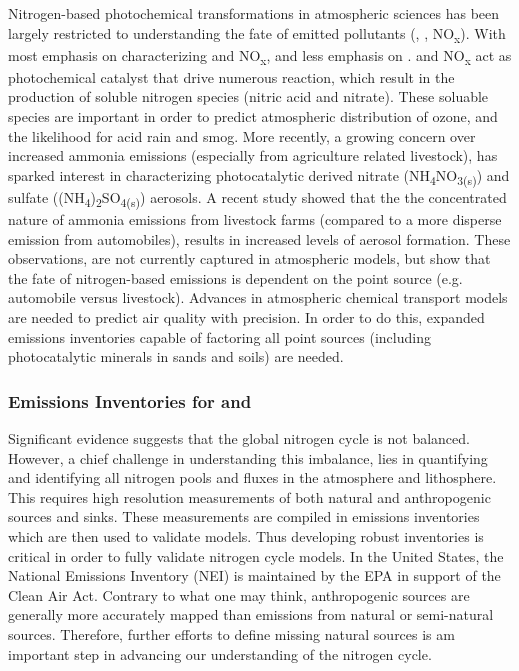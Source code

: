 Nitrogen-based photochemical transformations in atmospheric sciences has been largely  restricted to understanding the fate of emitted pollutants (\NH, \NO, NO\textsubscript{x})\cite{hahn_1982}. With most emphasis on characterizing \NO\hspace{2mm}and NO\textsubscript{x}, and less emphasis on \NH. \NO\hspace{2mm}and NO\textsubscript{x} act as photochemical catalyst that drive numerous reaction\cite{hahn_1982,spicer_1977}, which result in the production of soluble nitrogen species (nitric acid and nitrate). These soluable species are important in order to predict atmospheric distribution of ozone, and the likelihood for acid rain and smog\cite{zheng_2005}. More recently, a growing concern over increased ammonia emissions (especially from agriculture related livestock), has sparked interest in characterizing photocatalytic derived nitrate (NH\textsubscript{4}NO\textsubscript{3}\textsubscript{(s)}) and sulfate ((NH\textsubscript{4})\textsubscript{2}SO\textsubscript{4}\textsubscript{(s)}) aerosols. A recent study showed that the the concentrated nature of ammonia emissions from livestock farms (compared to a more disperse emission from automobiles), results in increased levels of aerosol formation\cite{nowak_2012}. These observations, are not currently captured in atmospheric models, but show that the fate of nitrogen-based emissions is dependent on the point source (e.g. automobile versus livestock). Advances in atmospheric chemical transport models are needed to predict air quality with precision. In order to do this, expanded emissions inventories capable of factoring all point sources (including photocatalytic minerals in sands and soils) are needed. 

\subsubsection*{Emissions Inventories for \NH\hspace{.5mm} and \NO} 
\vspace{1mm}

Significant evidence suggests that the global nitrogen cycle is not balanced. However, a chief challenge in understanding this imbalance, lies in quantifying and identifying all nitrogen pools and fluxes in the atmosphere and lithosphere\cite{reis_2009}. This requires high resolution measurements of both natural and anthropogenic sources and sinks. These measurements are compiled in emissions inventories which are then used to validate models. Thus developing robust inventories is critical in order to fully validate nitrogen cycle models\cite{anderson_2003}. In the United States, the National Emissions Inventory (NEI) is maintained by the EPA in support of the Clean Air Act. Contrary to what one may think, anthropogenic sources are generally more accurately mapped than emissions from natural or semi-natural sources\cite{reis_2009}. Therefore, further efforts to define missing natural sources is am important step in advancing our understanding of the nitrogen cycle.


